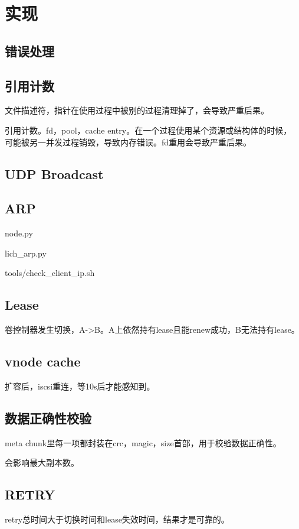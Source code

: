 \chapter{实现}

\section{错误处理}

\section{引用计数}

文件描述符，指针在使用过程中被别的过程清理掉了，会导致严重后果。

引用计数。fd，pool，cache entry。在一个过程使用某个资源或结构体的时候，
可能被另一并发过程销毁，导致内存错误。fd重用会导致严重后果。

\section{UDP Broadcast}

\section{ARP}

node.py

lich\_arp.py

tools/check\_client\_ip.sh

\section{Lease}

卷控制器发生切换，A->B。A上依然持有lease且能renew成功，B无法持有lease。

\section{vnode cache}

扩容后，iscsi重连，等10s后才能感知到。

\section{数据正确性校验}

meta chunk里每一项都封装在crc，magic，size首部，用于校验数据正确性。

会影响最大副本数。

\section{RETRY}

retry总时间大于切换时间和lease失效时间，结果才是可靠的。
